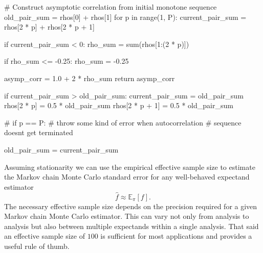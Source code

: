 \documentclass[
  letterpaper,
  DIV=11,
  numbers=noendperiod]{scrartcl}
\newenvironment{Shaded}{\begin{snugshade}}{\end{snugshade}}
\newcommand{\BuiltInTok}[1]{\textcolor[rgb]{0.00,0.23,0.31}{#1}}
\newcommand{\CommentTok}[1]{\textcolor[rgb]{0.37,0.37,0.37}{#1}}
\newcommand{\ControlFlowTok}[1]{\textcolor[rgb]{0.00,0.23,0.31}{#1}}
\newcommand{\DecValTok}[1]{\textcolor[rgb]{0.68,0.00,0.00}{#1}}
\newcommand{\FloatTok}[1]{\textcolor[rgb]{0.68,0.00,0.00}{#1}}
\newcommand{\KeywordTok}[1]{\textcolor[rgb]{0.00,0.23,0.31}{#1}}
\newcommand{\NormalTok}[1]{\textcolor[rgb]{0.00,0.23,0.31}{#1}}
\newcommand{\OperatorTok}[1]{\textcolor[rgb]{0.37,0.37,0.37}{#1}}
\begin{document}
\begin{Shaded}
\begin{Highlighting}[]
  \CommentTok{\# Construct asymptotic correlation from initial monotone sequence}
\NormalTok{  old\_pair\_sum }\OperatorTok{=}\NormalTok{ rhos[}\DecValTok{0}\NormalTok{] }\OperatorTok{+}\NormalTok{ rhos[}\DecValTok{1}\NormalTok{]}
  \ControlFlowTok{for}\NormalTok{ p }\KeywordTok{in} \BuiltInTok{range}\NormalTok{(}\DecValTok{1}\NormalTok{, P):}
\NormalTok{    current\_pair\_sum }\OperatorTok{=}\NormalTok{ rhos[}\DecValTok{2} \OperatorTok{*}\NormalTok{ p] }\OperatorTok{+}\NormalTok{ rhos[}\DecValTok{2} \OperatorTok{*}\NormalTok{ p }\OperatorTok{+} \DecValTok{1}\NormalTok{]}
    
    \ControlFlowTok{if}\NormalTok{ current\_pair\_sum }\OperatorTok{\textless{}} \DecValTok{0}\NormalTok{:}
\NormalTok{      rho\_sum }\OperatorTok{=} \BuiltInTok{sum}\NormalTok{(rhos[}\DecValTok{1}\NormalTok{:(}\DecValTok{2} \OperatorTok{*}\NormalTok{ p)])}
      
      \ControlFlowTok{if}\NormalTok{ rho\_sum }\OperatorTok{\textless{}=} \OperatorTok{{-}}\FloatTok{0.25}\NormalTok{:}
\NormalTok{        rho\_sum }\OperatorTok{=} \OperatorTok{{-}}\FloatTok{0.25}
      
\NormalTok{      asymp\_corr }\OperatorTok{=} \FloatTok{1.0} \OperatorTok{+} \DecValTok{2} \OperatorTok{*}\NormalTok{ rho\_sum}
      \ControlFlowTok{return}\NormalTok{ asymp\_corr}
    
    \ControlFlowTok{if}\NormalTok{ current\_pair\_sum }\OperatorTok{\textgreater{}}\NormalTok{ old\_pair\_sum:}
\NormalTok{      current\_pair\_sum }\OperatorTok{=}\NormalTok{ old\_pair\_sum}
\NormalTok{      rhos[}\DecValTok{2} \OperatorTok{*}\NormalTok{ p]     }\OperatorTok{=} \FloatTok{0.5} \OperatorTok{*}\NormalTok{ old\_pair\_sum}
\NormalTok{      rhos[}\DecValTok{2} \OperatorTok{*}\NormalTok{ p }\OperatorTok{+} \DecValTok{1}\NormalTok{] }\OperatorTok{=} \FloatTok{0.5} \OperatorTok{*}\NormalTok{ old\_pair\_sum}

    \CommentTok{\# if p == P:}
      \CommentTok{\# throw some kind of error when autocorrelation}
      \CommentTok{\# sequence doesn\textquotesingle{}t get terminated}
    
\NormalTok{    old\_pair\_sum }\OperatorTok{=}\NormalTok{ current\_pair\_sum}
\end{Highlighting}
\end{Shaded}

Assuming stationarity we can use the empirical effective sample size to
estimate the Markov chain Monte Carlo standard error for any
well-behaved expectand estimator \[
\hat{f} \approx \mathbb{E}_{\pi}[f].
\] The necessary effective sample size depends on the precision required
for a given Markov chain Monte Carlo estimator. This can vary not only
from analysis to analysis but also between multiple expectands within a
single analysis. That said an effective sample size of \(100\) is
sufficient for most applications and provides a useful rule of thumb.
\end{document}
